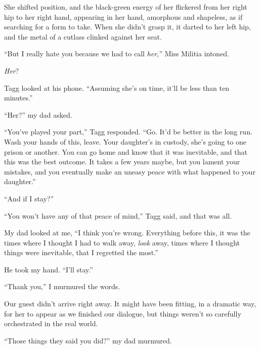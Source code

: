 She shifted position, and the black-green energy of her flickered from her right hip to her right hand, appearing in her hand, amorphous and shapeless, as if searching for a form to take.  When she didn't grasp it, it darted to her left hip, and the metal of a cutlass clinked against her seat.



``But I really hate you because we had to call \emph{her,}'' Miss Militia intoned.



\emph{Her}?



Tagg looked at his phone.  ``Assuming she's on time, it'll be less than ten minutes.''



``Her?'' my dad asked.



``You've played your part,'' Tagg responded.  ``Go.  It'd be better in the long run.  Wash your hands of this, leave.  Your daughter's in custody, she's going to one prison or another.  You can go home and know that it was inevitable, and that this was the best outcome.  It takes a few years maybe, but you lament your mistakes, and you eventually make an uneasy peace with what happened to your daughter.''



``And if I stay?''



``You won't have any of that peace of mind,'' Tagg said, and that was all.



My dad looked at me, ``I think you're wrong.  Everything before this, it was the times where I thought I had to walk away, \emph{look} away, times where I thought things were inevitable, that I regretted the most.''



He took my hand.  ``I'll stay.''



``Thank you,'' I murmured the words.



Our guest didn't arrive right away.  It might have been fitting, in a dramatic way, for her to appear as we finished our dialogue, but things weren't so carefully orchestrated in the real world.



``Those things they said you did?'' my dad murmured.



